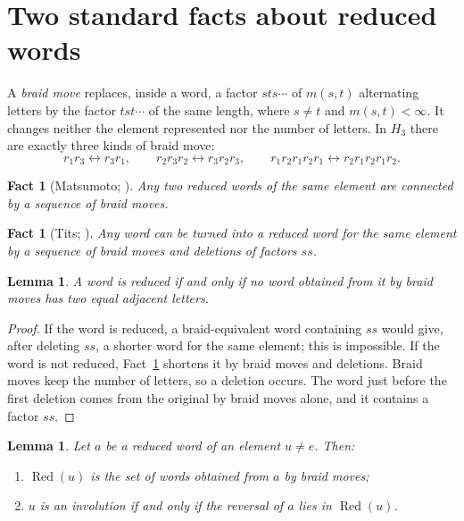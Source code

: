 \documentclass[11pt]{amsart}
\newtheorem{lemma}[theorem]{Lemma}
\newtheorem{fact}[theorem]{Fact}
\theoremstyle{definition}\newtheorem{definition}[theorem]{Definition}
\theoremstyle{remark}\newtheorem{remark}[theorem]{Remark}
\DeclareMathOperator{\Red}{Red}
\begin{document}
\section{Two standard facts about reduced words}\label{sec:facts}

A \emph{braid move} replaces, inside a word, a factor \(sts\cdots\) of \(m(s,t)\) alternating letters by the factor \(tst\cdots\) of the same length, where \(s\neq t\) and \(m(s,t)<\infty\). It changes neither the element represented nor the number of letters. In \(H_3\) there are exactly three kinds of braid move:
\begin{equation}\label{eq:braidH3}
r_1r_3\leftrightarrow r_3r_1,\qquad r_2r_3r_2\leftrightarrow r_3r_2r_3,\qquad r_1r_2r_1r_2r_1\leftrightarrow r_2r_1r_2r_1r_2.
\end{equation}

\begin{fact}[Matsumoto; {\cite[Thm.~3.3.1(ii)]{BB}}]\label{fact:matsumoto}
Any two reduced words of the same element are connected by a sequence of braid moves.
\end{fact}

\begin{fact}[Tits; {\cite[Thm.~3.3.1(i)]{BB}}]\label{fact:tits}
Any word can be turned into a reduced word for the same element by a sequence of braid moves and deletions of factors \(ss\).
\end{fact}

\begin{lemma}\label{lem:reduced}
A word is reduced if and only if no word obtained from it by braid moves has two equal adjacent letters.
\end{lemma}

\begin{proof}
If the word is reduced, a braid-equivalent word containing \(ss\) would give, after deleting \(ss\), a shorter word for the same element; this is impossible. If the word is not reduced, Fact~\ref{fact:tits} shortens it by braid moves and deletions. Braid moves keep the number of letters, so a deletion occurs. The word just before the first deletion comes from the original by braid moves alone, and it contains a factor \(ss\).
\end{proof}

\begin{lemma}\label{lem:invol}
Let \(a\) be a reduced word of an element \(u\neq e\). Then:
\begin{enumerate}
\item \(\Red(u)\) is the set of words obtained from \(a\) by braid moves;
\item \(u\) is an involution if and only if the reversal of \(a\) lies in \(\Red(u)\).
\end{enumerate}
\end{lemma}
\end{document}
